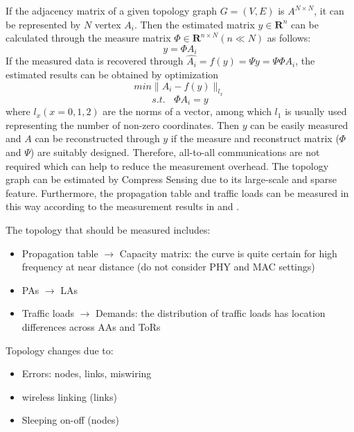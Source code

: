\documentclass[journal,onecolumn,11pt]{IEEEtran}
\begin{document}
If the adjacency matrix of a given topology graph $G=(V,E)$ is $A^{N\times N}$, it can be represented by $N$ vertex $A_i$. Then the estimated matrix $\hat{y}\in \textbf{R}^n$ can be calculated through the measure matrix $\Phi\in \textbf{R}^{n\times N} (n\ll N)$ as follows:
\begin{equation}
 y=\Phi A_i
 \label{estimation}
\end{equation}
If the measured data is recovered through $\hat{A_i}=f(y)=\Psi y=\Psi\Phi A_i$, the estimated results can be obtained by optimization
\begin{equation}
 min \parallel A_i-f(y) \parallel_{l_x}
 \label{recover1}
\end{equation}
\begin{equation}
 s.t.~~~~\Phi A_i = y
 \label{recover2}
\end{equation}
where $l_x (x=0,1,2)$ are the norms of a vector, among which $l_1$ is usually used representing the number of non-zero coordinates. Then $y$ can be easily measured and $A$ can be reconstructed through $y$ if the measure and reconstruct matrix ($\Phi$ and $\Psi$) are suitably designed. Therefore, all-to-all communications are not required which can help to reduce the measurement overhead. The topology graph can be estimated by Compress Sensing due to its large-scale and sparse feature. Furthermore, the propagation table and traffic loads can be measured in this way according to the measurement results in \cite{Halperin:2011:ADC:2018436.2018442} and \cite{Greenberg:2009:VSF:1592568.1592576}.

The topology that should be measured includes:
\begin{itemize}
  \item Propagation table $\rightarrow$ Capacity matrix: the curve is quite certain for high frequency at near distance (do not consider PHY and MAC settings) \cite{Zhou:2012:MMC:2342356.2342440,Halperin:2011:ADC:2018436.2018442}
  \item PAs $\rightarrow$ LAs
  \item Traffic loads $\rightarrow$ Demands: the distribution of traffic loads has location differences across AAs and ToRs \cite{Halperin:2011:ADC:2018436.2018442,Greenberg:2009:VSF:1592568.1592576}
\end{itemize}

Topology changes due to:
\begin{itemize}
  \item Errors: nodes, links, miswiring
  \item wireless linking (links)
  \item Sleeping on-off (nodes)
\end{itemize}
\end{document}
